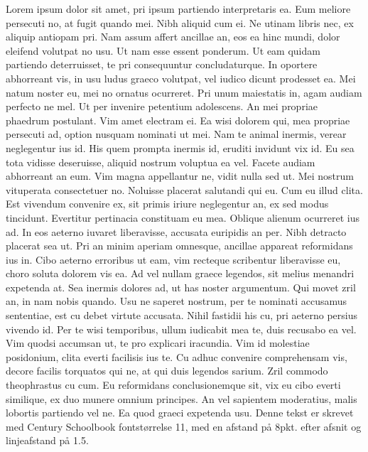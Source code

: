 Lorem ipsum dolor sit amet, pri ipsum partiendo interpretaris ea. Eum meliore persecuti no, at fugit quando mei. Nibh aliquid cum ei. Ne utinam libris nec, ex aliquip antiopam pri. Nam assum affert ancillae an, eos ea hinc mundi, dolor eleifend volutpat no usu. Ut nam esse essent ponderum. Ut eam quidam partiendo deterruisset, te pri consequuntur concludaturque. In oportere abhorreant vis, in usu ludus graeco volutpat, vel iudico dicunt prodesset ea. Mei natum noster eu, mei no ornatus ocurreret.
Pri unum maiestatis in, agam audiam perfecto ne mel. Ut per invenire petentium adolescens. An mei propriae phaedrum postulant. Vim amet electram ei. Ea wisi dolorem qui, mea propriae persecuti ad, option nusquam nominati ut mei. Nam te animal inermis, verear neglegentur ius id. His quem prompta inermis id, eruditi invidunt vix id. Eu sea tota vidisse deseruisse, aliquid nostrum voluptua ea vel. Facete audiam abhorreant an eum. Vim magna appellantur ne, vidit nulla sed ut. Mei nostrum vituperata consectetuer no. Noluisse placerat salutandi qui eu. Cum eu illud clita. Est vivendum convenire ex, sit primis iriure neglegentur an, ex sed modus tincidunt. Evertitur pertinacia constituam eu mea. Oblique alienum ocurreret ius ad. In eos aeterno iuvaret liberavisse, accusata euripidis an per. Nibh detracto placerat sea ut. Pri an minim aperiam omnesque, ancillae appareat reformidans ius in. Cibo aeterno erroribus ut eam, vim recteque scribentur liberavisse eu, choro soluta dolorem vis ea. Ad vel nullam graece legendos, sit melius menandri expetenda at. Sea inermis dolores ad, ut has noster argumentum. Qui movet zril an, in nam nobis quando. Usu ne saperet nostrum, per te nominati accusamus sententiae, est cu debet virtute accusata. Nihil fastidii his cu, pri aeterno persius vivendo id. Per te wisi temporibus, ullum iudicabit mea te, duis recusabo ea vel. Vim quodsi accumsan ut, te pro explicari iracundia. Vim id molestiae posidonium, clita everti facilisis ius te. Cu adhuc convenire comprehensam vis, decore facilis torquatos qui ne, at qui duis legendos sarium.
Zril commodo theophrastus cu cum. Eu reformidans conclusionemque sit, vix eu cibo everti similique, ex duo munere omnium principes. An vel sapientem moderatius, malis lobortis partiendo vel ne. Ea quod graeci expetenda usu.
Denne tekst er skrevet med Century Schoolbook fontstørrelse 11, med en afstand på 8pkt. efter afsnit og linjeafstand på 1.5.